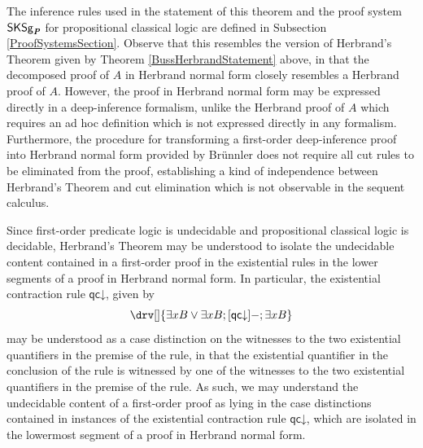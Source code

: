 \documentclass[10pt]{article}
\theoremstyle{definition}\newtheorem{remark}[theorem]{Remark}
\theoremstyle{definition}\newtheorem{example}[theorem]{Example}
\theoremstyle{definition}\newtheorem{definition}[theorem]{Definition}
\newcommand{\SKSProp}{{\mathsf{SKSg}_{\textbf{\textit{P}}}}}
\newcommand{\qcDown}{{\mathsf{qc\mathord\downarrow}}}
\begin{document}
	The inference rules used in the statement of this theorem and the proof system $\SKSProp$ for propositional classical logic are defined in Subsection \ref{ProofSystemsSection}. Observe that this resembles the version of Herbrand's Theorem given by Theorem \ref{BussHerbrandStatement} above, in that the decomposed proof of $A$ in Herbrand normal form closely resembles a Herbrand proof of $A$. However, the proof in Herbrand normal form may be expressed directly in a deep-inference formalism, unlike the Herbrand proof of $A$ which requires an ad hoc definition which is not expressed directly in any formalism. Furthermore, the procedure for transforming a first-order deep-inference proof into Herbrand normal form provided by Brünnler does not require all cut rules to be eliminated from the proof, establishing a kind of independence between Herbrand's Theorem and cut elimination which is not observable in the sequent calculus.
	
	Since first-order predicate logic is undecidable and propositional classical logic is decidable, Herbrand's Theorem may be understood to isolate the undecidable content contained in a first-order proof in the existential rules in the lower segments of a proof in Herbrand normal form. In particular, the existential contraction rule $\qcDown$, given by
	\[
		\drv[] {
			\exists x B \lor \exists x B ; [\qcDown]- ; \exists x B
		}
	\]
	may be understood as a case distinction on the witnesses to the two existential quantifiers in the premise of the rule, in that the existential quantifier in the conclusion of the rule is witnessed by one of the witnesses to the two existential quantifiers in the premise of the rule. As such, we may understand the undecidable content of a first-order proof as lying in the case distinctions contained in instances of the existential contraction rule $\qcDown$, which are isolated in the lowermost segment of a proof in Herbrand normal form.
	
\end{document}
